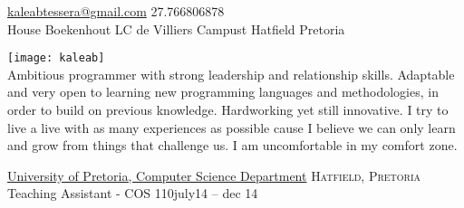 

\sloppy  %




\nobreakvspace{0.3em}  %

\noindent\href{mailto:kaleabtessera.at.gmail.dot.com}{kaleabtessera\mbox{}@\mbox{}gmail.com}\sbull
\textsmaller{+}27.766806878\sbull
\\
House Boekenhout\sbull
LC de Villiers Campust\sbull
Hatfield\sbull
Pretoria\\

\spacedhrule{0.9em}{-0.4em}  %
\begin{center}
\end{center}


\vspace{-1.3em}  %
\begin{multicols}{3}%

\noindent \texttt{[image: kaleab]}\\Ambitious programmer with strong leadership and relationship skills. Adaptable and very open to learning new programming languages and methodologies, in order to build on previous knowledge. Hardworking yet still innovative. I try to live a live with as many experiences as possible cause I believe we can only learn and grow from things that challenge us. I am uncomfortable in my comfort zone. 

\end{multicols}

\spacedhrule{0em}{-0.4em}

\headedsection  %
  {\href{http://www.cs.up.ac.za}{University of Pretoria, Computer Science Department}}
  {\textsc{Hatfield, Pretoria}} {%
  \headedsubsection
    {Teaching Assistant - COS 110}{july14 -- dec 14}
    {}
    }
    

